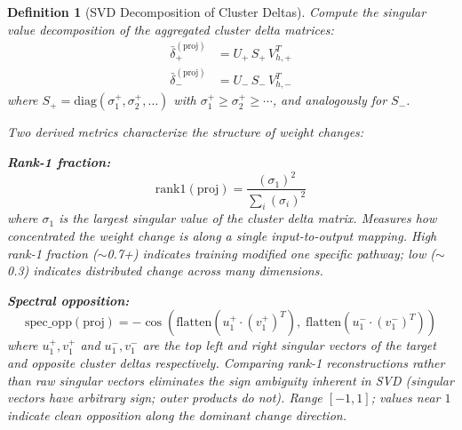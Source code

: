 \documentclass[11pt]{article}
\newtheorem{definition}{Definition}[section]
\begin{document}
\begin{definition}[SVD Decomposition of Cluster Deltas]
Compute the singular value decomposition of the aggregated cluster delta matrices:
\begin{align}
\bar{\delta}^{(\text{proj})}_+ &= U_+ \, S_+ \, V_{h,+}^T \\
\bar{\delta}^{(\text{proj})}_- &= U_- \, S_- \, V_{h,-}^T
\end{align}
where $S_+ = \text{diag}(\sigma^+_1, \sigma^+_2, \ldots)$ with $\sigma^+_1 \geq \sigma^+_2 \geq \cdots$, and analogously for $S_-$.

Two derived metrics characterize the structure of weight changes:

\textbf{Rank-1 fraction:}
\begin{equation}
\text{rank1}(\text{proj}) = \frac{(\sigma_1)^2}{\sum_i (\sigma_i)^2}
\end{equation}
where $\sigma_1$ is the largest singular value of the cluster delta matrix. Measures how concentrated the weight change is along a single input-to-output mapping. High rank-1 fraction ($\sim$0.7+) indicates training modified one specific pathway; low ($\sim$0.3) indicates distributed change across many dimensions.

\textbf{Spectral opposition:}
\begin{equation}
\text{spec\_opp}(\text{proj}) = -\cos\!\left(\text{flatten}(u^+_1 \cdot (v^+_1)^T),\; \text{flatten}(u^-_1 \cdot (v^-_1)^T)\right)
\end{equation}
where $u^+_1, v^+_1$ and $u^-_1, v^-_1$ are the top left and right singular vectors of the target and opposite cluster deltas respectively. Comparing rank-1 reconstructions rather than raw singular vectors eliminates the sign ambiguity inherent in SVD (singular vectors have arbitrary sign; outer products do not). Range $[-1,1]$; values near $1$ indicate clean opposition along the dominant change direction.
\end{definition}
\end{document}

